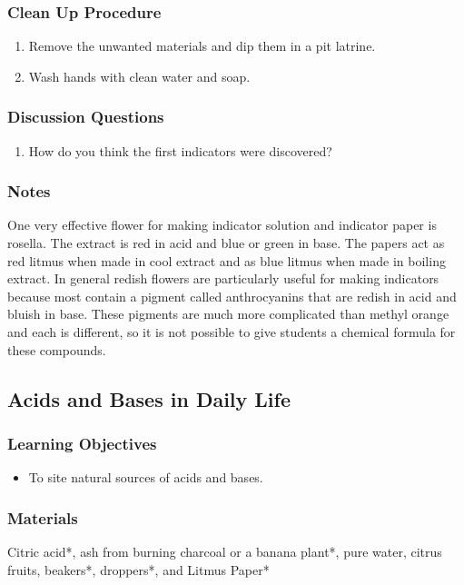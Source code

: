 \subsubsection*{Clean Up Procedure}
\begin{enumerate}
\item{Remove the unwanted materials and dip them in a pit latrine.}
\item{Wash hands with clean water and soap.}
\end{enumerate}

\subsubsection*{Discussion Questions}
\begin{enumerate}
\item{How do you think the first indicators were discovered?}
\end{enumerate}

\subsubsection*{Notes}
One very effective flower for making indicator solution and indicator paper is rosella. The extract is red in acid and blue or green in base. The papers act as red litmus when made in cool extract and as blue litmus when made in boiling extract. In general redish flowers are particularly useful for making indicators because most contain a pigment called anthrocyanins that are redish in acid and bluish in base. These pigments are much more complicated than methyl orange and each is different, so it is not possible to give students a chemical formula for these compounds.

\subsection{Acids and Bases in Daily Life}

\subsubsection*{Learning Objectives}
\begin{itemize}
\item{To site natural sources of acids and bases.}
\end{itemize}

\subsubsection*{Materials}
Citric acid*, ash from burning charcoal or a banana plant*, pure water, citrus fruits, beakers*, droppers*, and Litmus Paper*

